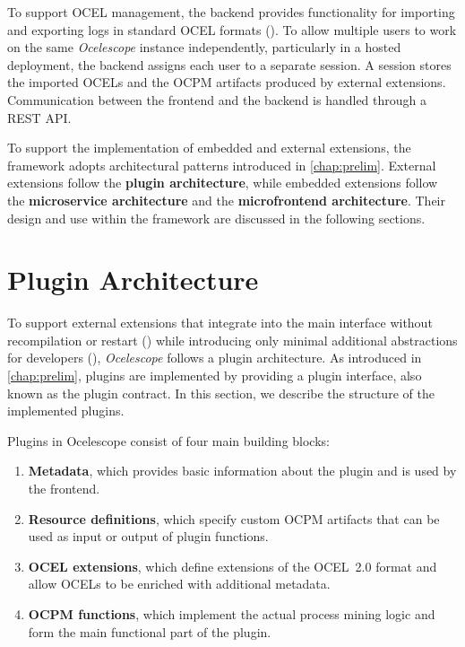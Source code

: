To support OCEL management, the backend provides functionality for importing and exporting logs in standard OCEL formats ().
To allow multiple users to work on the same \textit{Ocelescope} instance independently, particularly in a hosted deployment, the backend assigns each user to a separate session.
A session stores the imported OCELs and the OCPM artifacts produced by external extensions.
Communication between the frontend and the backend is handled through a REST API.

To support the implementation of embedded and external extensions, the framework adopts architectural patterns introduced in \cref{chap:prelim}.
External extensions follow the \textbf{plugin architecture}, while embedded extensions follow the \textbf{microservice architecture} and the \textbf{microfrontend architecture}.
Their design and use within the framework are discussed in the following sections.

\section{Plugin Architecture}

To support external extensions that integrate into the main interface without recompilation or restart () while introducing only minimal additional abstractions for developers (), \textit{Ocelescope} follows a plugin architecture.
As introduced in \cref{chap:prelim}, plugins are implemented by providing a plugin interface, also known as the plugin contract.
In this section, we describe the structure of the implemented plugins.

Plugins in Ocelescope consist of four main building blocks:

\begin{enumerate}
	\item \textbf{Metadata}, which provides basic information about the plugin and is used by the frontend.
	\item \textbf{Resource definitions}, which specify custom OCPM artifacts that can be used as input or output of plugin functions.
	\item \textbf{OCEL extensions}, which define extensions of the OCEL~2.0 format and allow OCELs to be enriched with additional metadata.
	\item \textbf{OCPM functions}, which implement the actual process mining logic and form the main functional part of the plugin.
\end{enumerate}

